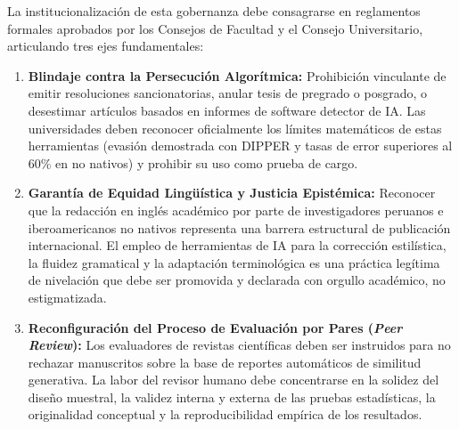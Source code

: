 La institucionalización de esta gobernanza debe consagrarse en reglamentos formales aprobados por los Consejos de Facultad y el Consejo Universitario, articulando tres ejes fundamentales:
\begin{enumerate}
    \item \textbf{Blindaje contra la Persecución Algorítmica:} Prohibición vinculante de emitir resoluciones sancionatorias, anular tesis de pregrado o posgrado, o desestimar artículos basados en informes de software detector de IA. Las universidades deben reconocer oficialmente los límites matemáticos de estas herramientas (evasión demostrada con DIPPER y tasas de error superiores al 60\% en no nativos) y prohibir su uso como prueba de cargo.
    \item \textbf{Garantía de Equidad Lingüística y Justicia Epistémica:} Reconocer que la redacción en inglés académico por parte de investigadores peruanos e iberoamericanos no nativos representa una barrera estructural de publicación internacional. El empleo de herramientas de IA para la corrección estilística, la fluidez gramatical y la adaptación terminológica es una práctica legítima de nivelación que debe ser promovida y declarada con orgullo académico, no estigmatizada.
    \item \textbf{Reconfiguración del Proceso de Evaluación por Pares (\textit{Peer Review}):} Los evaluadores de revistas científicas deben ser instruidos para no rechazar manuscritos sobre la base de reportes automáticos de similitud generativa. La labor del revisor humano debe concentrarse en la solidez del diseño muestral, la validez interna y externa de las pruebas estadísticas, la originalidad conceptual y la reproducibilidad empírica de los resultados.
\end{enumerate}

